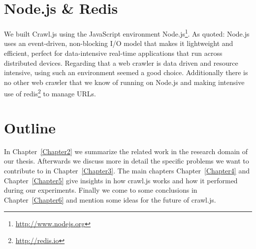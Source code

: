 \section{Node.js \& Redis}
We built Crawl.js using the JavaScript environment Node.js\footnote{\url{http://www.nodejs.org}}. As quoted: Node.js uses an event-driven, non-blocking I/O model that makes it lightweight and efficient, perfect for data-intensive real-time applications that run across distributed devices. Regarding that a web crawler is data driven and resource intensive, using such an environment seemed a good choice. Additionally there is no other web crawler that we know of running on Node.js and making intensive use of redis\footnote{\url{http://redis.io}} to manage URLs.

\section{Outline}
In Chapter~\ref{Chapter2} we summarize the related work in the research domain of our thesis. Afterwards we discuss more in detail the specific problems we want to contribute to in Chapter~\ref{Chapter3}. The main chapters Chapter~\ref{Chapter4} and Chapter~\ref{Chapter5} give insights in how crawl.js works and how it performed during our experiments. Finally we come to some conclusions in Chapter~\ref{Chapter6} and mention some ideas for the future of crawl.js.
